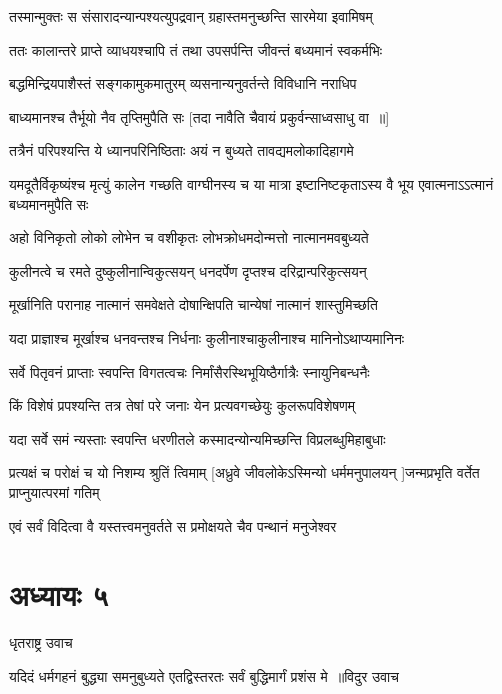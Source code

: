 \twolineshloka
{तस्मान्मुक्तः स संसारादन्यान्पश्यत्युपद्रवान्}
{ग्रहास्तमनुच्छन्ति सारमेया इवामिषम्}


\twolineshloka
{ततः कालान्तरे प्राप्ते व्याधयश्चापि तं तथा}
{उपसर्पन्ति जीवन्तं बध्यमानं स्वकर्मभिः}


\twolineshloka
{बद्धमिन्द्रियपाशैस्तं सङ्गकामुकमातुरम्}
{व्यसनान्यनुवर्तन्ते विविधानि नराधिप}


\twolineshloka
{बाध्यमानश्च तैर्भूयो नैव तृप्तिमुपैति सः}
{[तदा नावैति चैवायं प्रकुर्वन्साध्वसाधु वा ॥]}


\twolineshloka
{तत्रैनं परिपश्यन्ति ये ध्यानपरिनिष्ठिताः}
{अयं न बुध्यते तावद्यमलोकादिहागमे}


\threelineshloka
{यमदूतैर्विकृष्यंश्च मृत्युं कालेन गच्छति}
{वाग्घीनस्य च या मात्रा इष्टानिष्टकृताऽस्य वै}
{भूय एवात्मनाऽऽत्मानं बध्यमानमुपैति सः}


\twolineshloka
{अहो विनिकृतो लोको लोभेन च वशीकृतः}
{लोभक्रोधमदोन्मत्तो नात्मानमवबुध्यते}


\twolineshloka
{कुलीनत्वे च रमते दुष्कुलीनान्विकुत्सयन्}
{धनदर्पेण दृप्तश्च दरिद्रान्परिकुत्सयन्}


\twolineshloka
{मूर्खानिति परानाह नात्मानं समवेक्षते}
{दोषान्क्षिपति चान्येषां नात्मानं शास्तुमिच्छति}


\twolineshloka
{यदा प्राज्ञाश्च मूर्खाश्च धनवन्तश्च निर्धनाः}
{कुलीनाश्चाकुलीनाश्च मानिनोऽथाप्यमानिनः}


\twolineshloka
{सर्वे पितृवनं प्राप्ताः स्वपन्ति विगतत्वचः}
{निर्मांसैरस्थिभूयिष्ठैर्गात्रैः स्नायुनिबन्धनैः}


\twolineshloka
{किं विशेषं प्रपश्यन्ति तत्र तेषां परे जनाः}
{येन प्रत्यवगच्छेयुः कुलरूपविशेषणम्}


\twolineshloka
{यदा सर्वे समं न्यस्ताः स्वपन्ति धरणीतले}
{कस्मादन्योन्यमिच्छन्ति विप्रलब्धुमिहाबुधाः}


\threelineshloka
{प्रत्यक्षं च परोक्षं च यो निशम्य श्रुतिं त्विमाम्}
{[अध्रुवे जीवलोकेऽस्मिन्यो धर्ममनुपालयन्}
{]जन्मप्रभृति वर्तेत प्राप्नुयात्परमां गतिम्}


\twolineshloka
{एवं सर्वं विदित्वा वै यस्तत्त्वमनुवर्तते}
{स प्रमोक्षयते चैव पन्थानं मनुजेश्वर}


\chapter{अध्यायः ५}
\twolineshloka
{धृतराष्ट्र उवाच}
{}


\threelineshloka
{यदिदं धर्मगहनं बुद्ध्या समनुबुध्यते}
{एतद्विस्तरतः सर्वं बुद्धिमार्गं प्रशंस मे ॥विदुर उवाच}
{}


